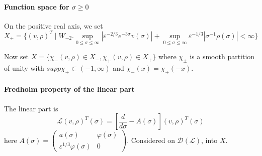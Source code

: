 \documentclass[letterpaper,11pt]{article}
\newcommand{\eps}{\varepsilon}
\numberwithin{equation}{section}
\theoremstyle{plain}
\begin{document}
\paragraph{Function space for $\sigma \ge 0$}
On the positive real axis, we set
\[
X_+ = \{ (v,\rho)^T \mid W_{-2}.
\sup_{0 \le \sigma \le  \infty } |\eps^{-2/3}e^{-3\sigma} v(\sigma)|  + \sup_{0 \le \sigma \le \infty} \eps^{-1/3}|\sigma^{-1} \rho(\sigma)| < \infty\}
\]

Now set $X = \{\chi_-(v,\rho) \in X_-, \chi_+(v,\rho) \in X_+\}$ where $\chi_\pm$ is a smooth partition of unity with $supp \chi_+ \subset (-1,\infty)$ and $\chi_-(x)=\chi_+(-x)$.

\paragraph{Fredholm property of the linear part}

The linear part is 
\[
\mathcal{L} (v,\rho)^T(\sigma) = \left[\frac{d}{d\sigma}  - A(\sigma) \right](v,\rho)^T(\sigma)
\]
here $A(\sigma)  = \begin{pmatrix}
 a(\sigma)&\varphi(\sigma) \\
\eps^{1/3}\varphi(\sigma)&0
\end{pmatrix}$. Considered on $\mathcal{D}(\mathcal{L})$, into $X$. 
\end{document}
